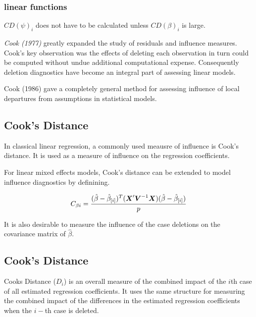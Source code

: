 \documentclass[12pt, a4paper]{article}
\begin{document}
\subsubsection{linear functions}

$CD(\psi)_i$ does not have to be calculated unless $CD(\beta)_i$ is large.


%	
%	
\textit{Cook (1977)} greatly expanded the study of residuals and influence measures. Cook's key observation was the effects of deleting each observation in turn could be computed without undue additional computational expense. Consequently deletion diagnostics have become an integral part of assessing linear models.


Cook (1986) gave a completely general method for assessing influence of local departures from
assumptions in statistical models.


\subsection{Cook's Distance}%
In classical linear regression, a commonly used meausre of influence is Cook's distance. It is used as a measure of influence on the regression coefficients.

For linear mixed effects models, Cook's distance can be extended to model influence diagnostics by definining.

\[ C_{\beta i} = {(\hat{\beta} - \hat{\beta}_{[i]})^{T}(\boldsymbol{X}^{\prime}\boldsymbol{V}^{-1}\boldsymbol{X}) (\hat{\beta} - \hat{\beta}_{[i]}) \over p}\]

It is also desirable to measure the influence of the case deletions on the covariance matrix of $\hat{\beta}$.






\subsection*{Cook's Distance}%
Cooks Distance ($D_{i}$) is an overall measure of the combined impact of the $i$th case of all estimated regression coefficients. It uses the same structure for measuring the combined impact of the differences in the estimated regression coefficients when the $i-$th case is deleted.
\end{document}
